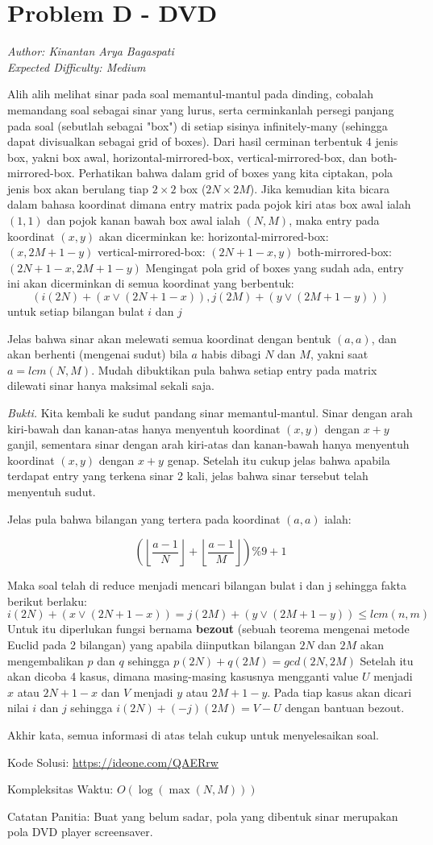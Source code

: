 \section*{Problem D - DVD}
\textit{Author: Kinantan Arya Bagaspati}
\\
\textit{Expected Difficulty: Medium}

Alih alih melihat sinar pada soal memantul-mantul pada dinding, cobalah memandang soal sebagai sinar yang lurus,
serta cerminkanlah persegi panjang pada soal (sebutlah sebagai "box") di setiap sisinya infinitely-many 
(sehingga dapat divisualkan sebagai grid of boxes).
Dari hasil cerminan terbentuk 4 jenis box, yakni box awal, horizontal-mirrored-box, vertical-mirrored-box, dan both-mirrored-box.
Perhatikan bahwa dalam grid of boxes yang kita ciptakan, pola jenis box akan berulang tiap $2 \times 2$ box ($2N \times 2M$).
Jika kemudian kita bicara dalam bahasa koordinat dimana entry matrix pada pojok kiri atas box awal ialah $(1,1)$
dan pojok kanan bawah box awal ialah $(N,M)$, maka entry pada koordinat $(x,y)$ akan dicerminkan ke:
horizontal-mirrored-box: $(x, 2M+1-y)$
vertical-mirrored-box: $(2N+1-x, y)$
both-mirrored-box: $(2N+1-x, 2M+1-y)$
Mengingat pola grid of boxes yang sudah ada, entry ini akan dicerminkan di semua koordinat yang berbentuk:
$$(i(2N) + (x \vee (2N+1-x)), j(2M) + (y \vee (2M+1-y)))$$ untuk setiap bilangan bulat $i$ dan $j$

Jelas bahwa sinar akan melewati semua koordinat dengan bentuk $(a,a)$, dan akan berhenti (mengenai sudut) bila $a$ habis dibagi $N$ dan $M$,
yakni saat $a = lcm(N,M)$.
Mudah dibuktikan pula bahwa setiap entry pada matrix dilewati sinar hanya maksimal sekali saja.

\textit{Bukti.}
Kita kembali ke sudut pandang sinar memantul-mantul. Sinar dengan arah kiri-bawah dan kanan-atas hanya menyentuh koordinat $(x,y)$
dengan $x+y$ ganjil, sementara sinar dengan arah kiri-atas dan kanan-bawah hanya menyentuh koordinat $(x,y)$ dengan $x+y$ genap.
Setelah itu cukup jelas bahwa apabila terdapat entry yang terkena sinar 2 kali, jelas bahwa sinar tersebut telah menyentuh sudut.

Jelas pula bahwa bilangan yang tertera pada koordinat $(a,a)$ ialah:

$$\left(\left \lfloor\frac{a-1}{N}\right\rfloor + \left\lfloor\frac{a-1}{M}\right \rfloor\right) \% 9 + 1$$

Maka soal telah di reduce menjadi mencari bilangan bulat i dan j sehingga fakta berikut berlaku:
$$i(2N) + (x \vee (2N+1-x)) = j(2M) + (y \vee (2M+1-y)) \leq lcm(n,m)$$
Untuk itu diperlukan fungsi bernama \textbf{bezout} (sebuah teorema mengenai metode Euclid pada 2 bilangan) yang apabila diinputkan bilangan $2N$ dan $2M$
akan mengembalikan $p$ dan $q$ sehingga $p(2N) + q(2M) = gcd(2N,2M)$
Setelah itu akan dicoba 4 kasus, dimana masing-masing kasusnya mengganti value $U$ menjadi $x$ atau $2N+1-x$ dan $V$ menjadi $y$ atau $2M+1-y$. 
Pada tiap kasus akan dicari nilai $i$ dan $j$ sehingga $i(2N) + (-j)(2M) = V - U$ dengan bantuan bezout.

Akhir kata, semua informasi di atas telah cukup untuk menyelesaikan soal.

Kode Solusi: \url{https://ideone.com/QAERrw}

Kompleksitas Waktu: $O(\log(\max(N, M)))$

Catatan Panitia: Buat yang belum sadar, pola yang dibentuk sinar merupakan pola DVD player screensaver.